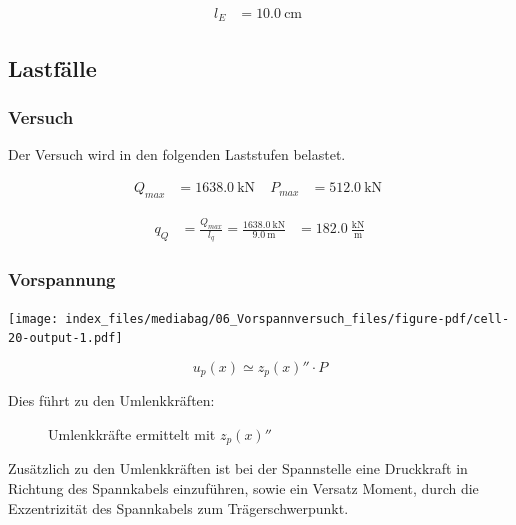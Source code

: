 \documentclass[
  11pt,
  letterpaper,
]{scrreprt}
\begin{document}
$$
\begin{aligned}
l_{E} &= 10.0\ \mathrm{cm} \;
\end{aligned}
$$

\subsection{Lastfälle}\label{lastfuxe4lle}

\subsubsection{Versuch}\label{versuch}

Der Versuch wird in den folgenden Laststufen belastet.

$$
\begin{aligned}
Q_{max} &= 1638.0\ \mathrm{kN} \; 
 &P_{max} &= 512.0\ \mathrm{kN} \;
\end{aligned}
$$

$$
\begin{aligned}
q_{Q} &= \frac{ Q_{max} }{ l_{q} }  = \frac{ 1638.0\ \mathrm{kN} }{ 9.0\ \mathrm{m} } &= 182.0\ \frac{\mathrm{kN}}{\mathrm{m}}  
\end{aligned}
$$

\subsubsection{Vorspannung}\label{vorspannung-1}

\texttt{[image: index\_files/mediabag/06\_Vorspannversuch\_files/figure-pdf/cell-20-output-1.pdf]}

\[
u_p(x) \simeq z_p(x)'' \cdot P
\]

Dies führt zu den Umlenkkräften:

\begin{figure}[H]


\caption{\label{fig-u_p_von_x}Umlenkkräfte ermittelt mit \(z_p(x)''\)}

\end{figure}%

Zusätzlich zu den Umlenkkräften ist bei der Spannstelle eine Druckkraft
in Richtung des Spannkabels einzuführen, sowie ein Versatz Moment, durch
die Exzentrizität des Spannkabels zum Trägerschwerpunkt.
\end{document}
